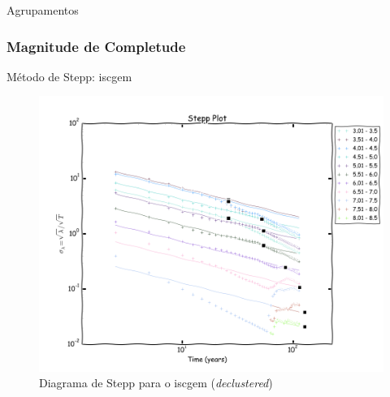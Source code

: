 \documentclass[ucs,8pt]{beamer}
\begin{document}
\begin{frame}{Agrupamentos}
\begin{figure}[H]
\begin{subfigure}[t]{0.50\textwidth}
			\label{fig:br_decluster}
    \end{subfigure}%
	\label{fig:eq_decluster}
\end{figure}
\end{frame}


\subsubsection{Magnitude de Completude}



\begin{frame}{Método de Stepp: \gls{iscgem}}
\begin{figure}[H]
	\centering
	\includegraphics[height=0.90\textheight]{stepp_sa}
	\caption{Diagrama de Stepp para o \gls{iscgem} (\emph{declustered})}
	\label{fig:sa_stepp}
\end{figure}
\end{frame}
\end{document}
